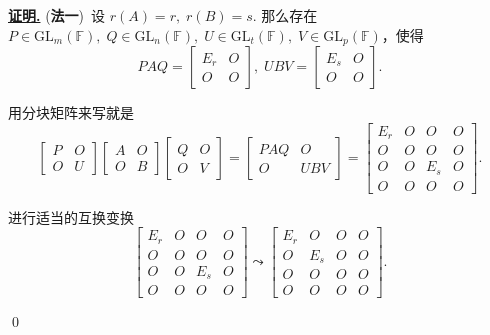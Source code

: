 \documentclass[10pt,openany]{article}
\theoremstyle{thmstyle} %
\theoremstyle{defstyle} %
\theoremstyle{prostyle} %
\theoremstyle{exastyle}
\theoremstyle{remstyle}
\renewenvironment{proof}[1][证明]{\par\underline{\textbf{#1.}} \;\fangsong}{\qed\par}
\newcommand{\F}{\mathbb{F}}
\newcommand{\gfn}{\text{GL}_n(\mathbb{F})}
\newcommand{\gfm}{\text{GL}_m(\mathbb{F})}
\begin{document}
\begin{proof}
	(\textbf{法一})\ 设 \( r(A)=r, \; r(B)=s \). 那么存在 \( P \in \gfm, \; Q \in \gfn, \; U \in \text{GL}_t(\F), \; V \in \text{GL}_p(\F) \)，使得
	\[ PAQ=\begin{bmatrix}
		E_r & O \\ O & O
	\end{bmatrix}, \; UBV=\begin{bmatrix}
	E_s & O \\ O & O
	\end{bmatrix}. \]
	
	用分块矩阵来写就是
	\[ \begin{bmatrix}
		P & O \\ O & U
	\end{bmatrix}\begin{bmatrix}
	A & O \\ O & B
	\end{bmatrix}\begin{bmatrix}
	Q & O \\ O & V
	\end{bmatrix}=\begin{bmatrix}
	PAQ & O \\ O & UBV
	\end{bmatrix}=\begin{bmatrix}
	E_r & O & O & O \\ O & O & O & O \\ O & O & E_s & O \\ O & O & O & O 
\end{bmatrix}. \]

进行适当的互换变换
\[ \begin{bmatrix}
	E_r & O & O & O \\ O & O & O & O \\ O & O & E_s & O \\ O & O & O & O 
\end{bmatrix} \leadsto \begin{bmatrix}
E_r & O & O & O \\ O & E_s & O & O \\ O & O & O & O \\ O & O & O & O 
\end{bmatrix}. \]


\end{proof}
\end{document}
